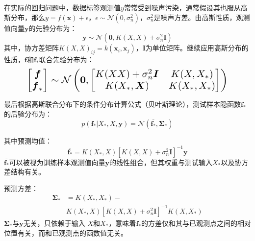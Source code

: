 \documentclass[final]{cvpr}
\begin{document}
在实际的回归问题中，数据标签观测值$y$常常受到噪声污染，通常假设其也服从高斯分布，那么$y=f(\boldsymbol{x})+\epsilon$，$\epsilon\sim \mathcal{N}(0,\sigma_n^2)$，$\sigma_n^2$是噪声方差。由高斯性质，观测值向量$\boldsymbol{y}$的先验分布为：
\begin{equation}
    \boldsymbol{y}\sim \mathcal{N}(\boldsymbol{0},K({X},{X})+\sigma_n^2\boldsymbol{I})
\end{equation}
其中，协方差矩阵$K(X,X)_{ij}=k(\boldsymbol{x}_{i}, \boldsymbol{x}_{j})$，$\boldsymbol{I}$为单位矩阵。继续应用高斯分布的性质，$\boldsymbol{f}$和$\boldsymbol{f_{*}}$联合先验分布为：
\begin{equation}
    \resizebox{0.85\hsize}{!}{$
    \begin{bmatrix}
        \boldsymbol{f}\\
        \boldsymbol{f}_*
    \end{bmatrix}
    \sim \mathcal{N} \left(
    \boldsymbol{0},
    \begin{bmatrix}
        K({X}{X})+\sigma_n^2\boldsymbol{I} & K({X},{X}_*)\\
        K({X}_*,\boldsymbol{X}) & K({X}_*,{X}_*)
    \end{bmatrix}
    \right)
    $}
\end{equation}

最后根据高斯联合分布下的条件分布计算公式（贝叶斯理论），测试样本隐函数$\boldsymbol{f}_*$的后验分布为：
\begin{equation}\label{eq:GP-posterior}
    p(\boldsymbol{f}_*|{X}_*,{X},\boldsymbol{y})=\mathcal{N}(\bar{\boldsymbol{f}_*},\boldsymbol{\Sigma}_*)
\end{equation}

其中预测均值：
\begin{equation}
    \bar{\boldsymbol{f}_*}=K({X}_*,{X})[K({X},{X})+\sigma_n^2\boldsymbol{I}]^{-1}\boldsymbol{y}\label{eq:GP-mean}
\end{equation}
$\bar{\boldsymbol{f}_*}$可以被视为训练样本观测值向量$\boldsymbol{y}$的线性组合，但其权重与测试输入${X}_{*}$以及协方差结构有关。

预测方差：
\begin{equation}
    \begin{split}
    \boldsymbol{\Sigma}_*&=K({X}_*,{X}_*)-\\
    &K({X}_*,{X})[K({X},{X})+\sigma_n^2\boldsymbol{I}]^{-1}K({X},{X}_*)
    \end{split}\label{eq:GP-var}
\end{equation}
$\boldsymbol{\Sigma}_*$与$\boldsymbol{y}$无关，只依赖于输入  ${X}$和${X}_{*}$，意味着$\boldsymbol{f}_{*}$的方差仅和其与已观测点之间的相对位置有关，而和已观测点的函数值无关\cite{murphy2012machine}。
\end{document}
